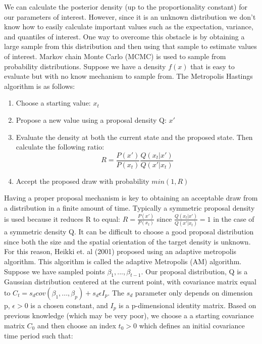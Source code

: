 We can calculate the posterior density (up to the proportionality constant) for our parameters of interest. However, since it is an unknown distribution we don't know how to easily calculate important values such as the expectation, variance, and quantiles of interest. One way to overcome this obstacle is by obtaining a large sample from this distribution and then using that sample to estimate values of interest. Markov chain Monte Carlo (MCMC) is used to sample from probability distributions. Suppose we have a density $f(x)$ that is easy to evaluate but with no know mechanism to sample from. The Metropolis Hastings algorithm is as follows: 

\begin{enumerate}
\item Choose a starting value: $x_t$
\item Propose a new value using a proposal density Q: $x'$
\item Evaluate the density at both the current state and the proposed state. Then calculate the following ratio: $$  R = \frac{P(x')}{P(x_t)}  \frac{Q(x_t | x')}{Q(x'|x_t)}      $$
\item Accept the proposed draw with probability $min(1,R)$
\end{enumerate}

Having a proper proposal mechanism is key to obtaining an acceptable draw from a distribution in a finite amount of time. Typically a symmetric proposal density is used because it reduces R to equal:  $  R = \frac{P(x')}{P(x_t)}  $ since  $\frac{Q(x_t | x')}{Q(x'|x_t)}  =1  $ in the case of a symmetric density Q. It can be difficult to choose a good proposal distribution since both the size and the spatial orientation of the target density is unknown. For this reason, Heikki et. al (2001) proposed using an adaptive metropolis algorithm. This algorithm is called the adaptive Metropolis (AM) algorithm. \\


Suppose we have sampled points $\beta_1,...,\beta_{t-1}$. Our proposal distribution, Q is a Gaussian distribution centered at the current point, with covariance matrix equal to $C_t=s_d cov(\beta_1,...,\beta_{p}) + s_d \epsilon I_p$. The $s_d$ parameter only depends on dimension p, $\epsilon > 0$ is a chosen constant, and $I_p$ is a p-dimensional identity matrix. Based on previous knowledge (which may be very poor), we choose a a starting covariance matrix $C_0$ and then choose an index $t_0 > 0$ which defines an initial covariance time period such that: 

